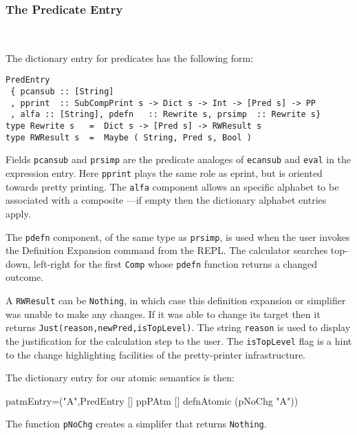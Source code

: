 \subsubsection{The Predicate Entry}~

The dictionary entry for predicates has the following form:
\begin{verbatim}
PredEntry
 { pcansub :: [String]
 , pprint  :: SubCompPrint s -> Dict s -> Int -> [Pred s] -> PP
 , alfa :: [String], pdefn   :: Rewrite s, prsimp  :: Rewrite s}
type Rewrite s   =  Dict s -> [Pred s] -> RWResult s
type RWResult s  =  Maybe ( String, Pred s, Bool ) 
\end{verbatim}
Fields \texttt{pcansub} and \texttt{prsimp} are the predicate analoges
of \texttt{ecansub} and \texttt{eval} in the expression entry.
Here \texttt{pprint} plays the same role as eprint,
but is oriented towards pretty printing.
The \texttt{alfa} component allows an specific alphabet to
be associated with a composite
---if empty then the dictionary alphabet entries apply.

The \texttt{pdefn} component, of the same type as \texttt{prsimp},
is used when the user invokes the Definition Expansion
command from the REPL.
The calculator searches top-down, left-right
    for the first \texttt{Comp} whose \texttt{pdefn} function
    returns a changed outcome.

A \texttt{RWResult} can be \texttt{Nothing},
in which case this definition expansion or simplifier
was unable to make any changes.
If it was able to change its target then it returns
\texttt{Just(reason,newPred,isTopLevel)}.
The string \texttt{reason} is used to display the justification for the
calculation step to the user.
The \texttt{isTopLevel} flag is a hint to the change highlighting facilities
of the pretty-printer infrastructure.


The dictionary entry for our atomic semantics is then:
\begin{code}
patmEntry=("A",PredEntry [] ppPAtm [] defnAtomic (pNoChg "A"))
\end{code}
The function \texttt{pNoChg} creates a simplifer that returns \texttt{Nothing}.
